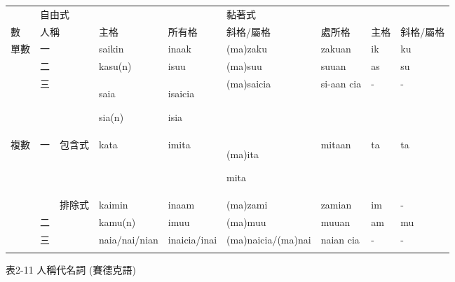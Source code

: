 \tabletail{}
\tablelasttail{}
\begin{tabularx}{\textwidth}{XXXXXXXXX}
\lsptoprule

\multicolumn{3}{X}{ 人稱代名詞} & \multicolumn{4}{X}{ 自由式} & \multicolumn{2}{X}{ 黏著式}\\
\multicolumn{1}{X}{ 數} & \multicolumn{2}{X}{ 人稱} & 主格 & 所有格 & 斜格/屬格 & 處所格 & 主格 & 斜格/屬格\\
\multicolumn{1}{X}{單數} & \multicolumn{2}{X}{一} & saikin & inaak & (ma)zaku & zakuan & ik & ku\\
& \multicolumn{2}{X}{二} & kasu(n) & isuu & (ma)suu & suuan & as & su\\
\hhline{~--------} & \multicolumn{2}{X}{三} & saia

sia(n) & isaicia

isia & (ma)saicia & si-aan cia & {}- & {}-\\
\multicolumn{1}{X}{複數} & \multicolumn{1}{X}{一} & 包含式 & kata & imita & (ma)ita

mita & mitaan & ta & ta\\
&  & 排除式 & kaimin & inaam & (ma)zami & zamian & im & {}-\\
\hhline{~--------} & \multicolumn{2}{X}{二} & kamu(n) & imuu & (ma)muu & muuan & am & mu\\
\hhline{~--------} & \multicolumn{2}{X}{三} & naia/nai/nian & inaicia/inai & (ma)naicia/(ma)nai & naian cia & {}- & {}-\\
\hhline{~--------}
\lspbottomrule
\end{tabularx}
表2-11 人稱代名詞 (賽德克語)

\tablefirsthead{}

